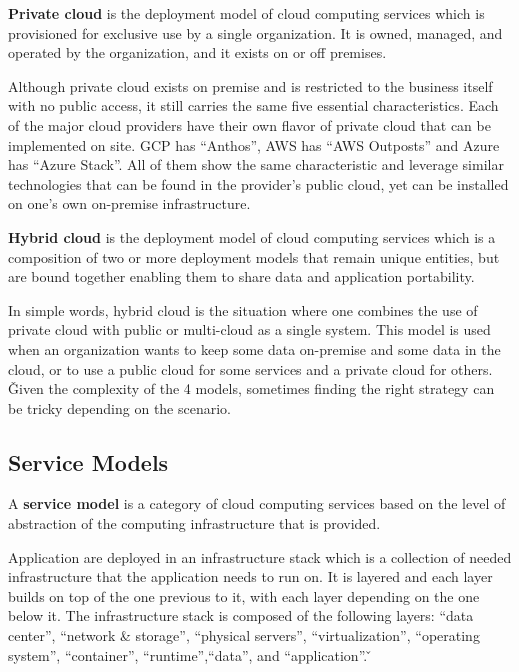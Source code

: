 \textbf{Private cloud} is the deployment model of cloud computing services which is provisioned for exclusive use by a
single organization. It is owned, managed, and operated by the organization, and it exists on or off premises.
\ed


Although private cloud exists on premise and is restricted to the business itself with no public access, it still
carries the same five essential characteristics. Each of the major cloud providers have their own flavor of private
cloud that can be implemented on site. GCP has ``Anthos'', AWS has ``AWS Outposts'' and Azure has ``Azure Stack''. All
of them show the same characteristic and leverage similar technologies that can be found in the provider's public cloud,
yet can be installed on one's own on-premise infrastructure.

\textbf{Hybrid cloud} is the deployment model of cloud computing services which is a composition of two or more
deployment models that remain unique entities, but are bound together enabling them to share data and application
portability.
\ed


In simple words, hybrid cloud is the situation where one combines the use of private cloud with public or multi-cloud
as a single system. This model is used when an organization wants to keep some data on-premise and some data in the
cloud, or to use a public cloud for some services and a private cloud for others. \v

Given the complexity of the 4 models, sometimes finding the right strategy can be tricky depending on the scenario.

\subsection{Service Models}

A \textbf{service model} is a category of cloud computing services based on the level of abstraction of the computing
infrastructure that is provided.
\ed

Application are deployed in an infrastructure stack which is a collection of needed infrastructure that the application
needs to run on. It is layered and each layer builds on top of the one previous to it, with each layer depending on the
one below it. The infrastructure stack is composed of the following layers: ``data center'', ``network \& storage'',
``physical servers'', ``virtualization'', ``operating system'', ``container'', ``runtime'',``data'', and
``application''.
\v

